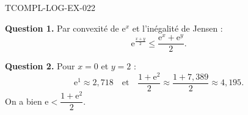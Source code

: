 \begin{corrige}{TCOMPL-LOG-EX-022}

\textbf{Question 1.} Par convexité de $\mathrm{e}^x$ et l'inégalité de Jensen :
\[ \mathrm{e}^{\frac{x+y}{2}} \leq \frac{\mathrm{e}^x + \mathrm{e}^y}{2}. \]


\textbf{Question 2.} Pour $x=0$ et $y=2$ :
\[ \mathrm{e}^{1} \approx 2{,}718 \quad \text{et} \quad \frac{1 + \mathrm{e}^2}{2} \approx \frac{1 + 7{,}389}{2} \approx 4{,}195. \]
On a bien $\mathrm{e} < \dfrac{1 + \mathrm{e}^2}{2}$.

\end{corrige}
